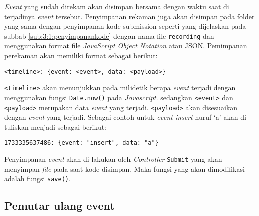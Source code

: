 \textit{Event} yang sudah direkam akan disimpan bersama dengan waktu saat di terjadinya \textit{event} tersebut. Penyimpanan rekaman juga akan disimpan pada folder yang sama dengan penyimpanan kode submission seperti yang dijelaskan pada subbab \ref{sub:3:1:penyimpanankode} dengan nama file \verb|recording| dan menggunakan format file \textit{JavaScript Object Notation} atau JSON. Pemimpanan perekaman akan memiliki format sebagai berikut:

\begin{center}
	\verb|<timeline>: {event: <event>, data: <payload>}|
\end{center}

\verb|<timeline>| akan menunjukkan pada milidetik berapa \textit{event} terjadi dengan menggunakan fungsi \verb|Date.now()| pada \textit{Javascript}. sedangkan \verb|<event>| dan \verb|<payload>| merupakan data \textit{event} yang terjadi. \verb|<payload>| akan disesuaikan dengan \textit{event} yang terjadi. Sebagai contoh untuk \textit{event insert} huruf `a' akan di tuliskan menjadi sebagai berikut:

\begin{center}
	\verb|1733335637486: {event: "insert", data: "a"}|
\end{center}

Penyimpanan \textit{event} akan di lakukan oleh \textit{Controller} \verb|Submit| yang akan menyimpan \textit{file} pada saat kode disimpan. Maka fungsi yang akan dimodifikasi adalah fungsi \verb|save()|.

\begin{comment}
Rekam 3 event aja:
- Mouseup dari editor
- beforeEndOperation dari selection
- afterExec dari commands

Penjelasan
- Mouseup + beforeEndOperation (ini ngeliat cursor movement + selection movement). [yang ini buat mouse].
- afterExec: Semua operation yang akan dilakukan di keyboard (kaya "insert", "copy", "paste"), tapi kaya right-click mouse terus paste jg bisa.

Rekam juga input + output yang dimasukkin tapi ga sampe cursor

Simpen di tempat yg sama kaya penyimpanan kode, mungkin di pisah per submission juga. simpen kaya json aja biar gampang dibaca?. simpen timestart, event: [time: {action: ?, payload: ?}].
\end{comment}

\subsection{Pemutar ulang event}
\label{sub:3:2:pemutarulang}

